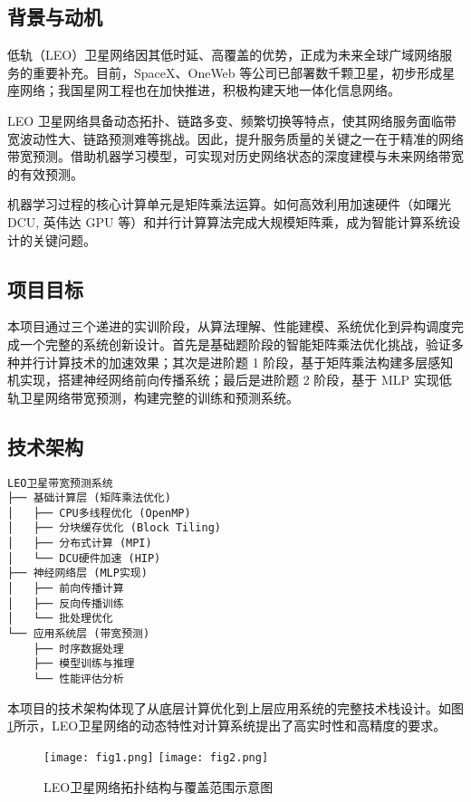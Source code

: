 \documentclass[a4paper]{article}
\begin{document}
\subsection{背景与动机}

低轨（LEO）卫星网络因其低时延、高覆盖的优势，正成为未来全球广域网络服务的重要补充。目前，SpaceX、OneWeb 等公司已部署数千颗卫星，初步形成星座网络；我国星网工程也在加快推进，积极构建天地一体化信息网络。

LEO 卫星网络具备动态拓扑、链路多变、频繁切换等特点，使其网络服务面临带宽波动性大、链路预测难等挑战。因此，提升服务质量的关键之一在于精准的网络带宽预测。借助机器学习模型，可实现对历史网络状态的深度建模与未来网络带宽的有效预测。

机器学习过程的核心计算单元是矩阵乘法运算。如何高效利用加速硬件（如曙光 DCU, 英伟达 GPU 等）和并行计算算法完成大规模矩阵乘，成为智能计算系统设计的关键问题。

\subsection{项目目标}

本项目通过三个递进的实训阶段，从算法理解、性能建模、系统优化到异构调度完成一个完整的系统创新设计。首先是基础题阶段的智能矩阵乘法优化挑战，验证多种并行计算技术的加速效果；其次是进阶题 1 阶段，基于矩阵乘法构建多层感知机实现，搭建神经网络前向传播系统；最后是进阶题 2 阶段，基于 MLP 实现低轨卫星网络带宽预测，构建完整的训练和预测系统。

\subsection{技术架构}

\begin{verbatim}
LEO卫星带宽预测系统
├── 基础计算层 (矩阵乘法优化)
│   ├── CPU多线程优化 (OpenMP)
│   ├── 分块缓存优化 (Block Tiling)
│   ├── 分布式计算 (MPI)
│   └── DCU硬件加速 (HIP)
├── 神经网络层 (MLP实现)
│   ├── 前向传播计算
│   ├── 反向传播训练
│   └── 批处理优化
└── 应用系统层 (带宽预测)
    ├── 时序数据处理
    ├── 模型训练与推理
    └── 性能评估分析
\end{verbatim}

本项目的技术架构体现了从底层计算优化到上层应用系统的完整技术栈设计。如图\ref{fig:leo_satellite_network}所示，LEO卫星网络的动态特性对计算系统提出了高实时性和高精度的要求。

\begin{figure}[H]
\centering
\texttt{[image: fig1.png]}
\hfill
\texttt{[image: fig2.png]}
\caption{LEO卫星网络拓扑结构与覆盖范围示意图}
\label{fig:leo_satellite_network}
\end{figure}
\end{document}
